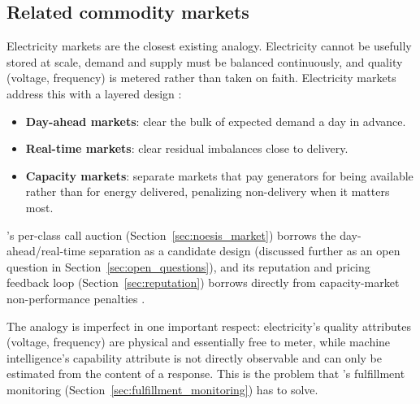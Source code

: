 \subsection{Related commodity markets}
\label{sec:related_commodity_markets}

Electricity markets are the closest existing analogy. Electricity cannot be
usefully stored at scale, demand and supply must be balanced continuously, and
quality (voltage, frequency) is metered rather than taken on faith. Electricity
markets address this with a layered design \cite{stoft2002, cramton2017}:

\begin{itemize}
  \item \textbf{Day-ahead markets}: clear the bulk of expected demand a day in
    advance.
  \item \textbf{Real-time markets}: clear residual imbalances close to
    delivery.
  \item \textbf{Capacity markets}: separate markets that pay generators for
    being available rather than for energy delivered, penalizing non-delivery
    when it matters most.
\end{itemize}

\Noesis{}'s per-class call auction (Section~\ref{sec:noesis_market}) borrows the
day-ahead/real-time separation as a candidate design (discussed further as an
open question in Section~\ref{sec:open_questions}), and its reputation and
pricing feedback loop (Section~\ref{sec:reputation}) borrows directly from
capacity-market non-performance penalties \cite{cramtonstoft2005}.

The analogy is imperfect in one important respect: electricity's quality
attributes (voltage, frequency) are physical and essentially free to meter,
while machine intelligence's capability attribute is not directly observable
and can only be estimated from the content of a response. This is the problem
that \NoesisServer{}'s fulfillment monitoring
(Section~\ref{sec:fulfillment_monitoring}) has to solve.
